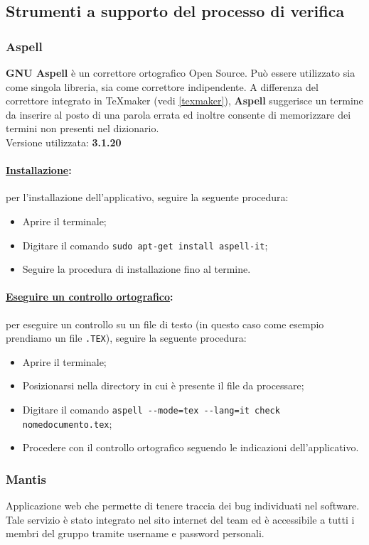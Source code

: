 \subsection{Strumenti a supporto del processo di verifica}

\subsubsection{Aspell}
\label{aspell}
\textbf{GNU Aspell} è un correttore ortografico Open Source. Può essere utilizzato sia come singola libreria, sia come correttore indipendente. A differenza del correttore integrato in \TeX{}maker (vedi \ref{texmaker}), \textbf{Aspell} suggerisce un termine da inserire al posto di una parola errata ed inoltre consente di memorizzare dei termini non presenti nel dizionario.\\
Versione utilizzata: \textbf{3.1.20}

\paragraph{\underline{Installazione}:} per l'installazione dell'applicativo, seguire la seguente procedura:
\begin{itemize}
\item Aprire il terminale;
\item Digitare il comando \verb!sudo apt-get install aspell-it!;
\item Seguire la procedura di installazione fino al termine.
\end{itemize}

\paragraph{\underline{Eseguire un controllo ortografico}:} per eseguire un controllo su un file di testo (in questo caso come esempio prendiamo un file \verb!.TEX!), seguire la seguente procedura:
\begin{itemize}
\item Aprire il terminale;
\item Posizionarsi nella directory in cui è presente il file da processare;
\item Digitare il comando \verb!aspell --mode=tex --lang=it check nomedocumento.tex!;
\item Procedere con il controllo ortografico seguendo le indicazioni dell'applicativo.
\end{itemize}

\subsubsection{Mantis}
\label{mantis}
Applicazione web che permette di tenere traccia dei bug individuati nel software. Tale servizio è stato integrato nel sito internet del team ed è accessibile a tutti i membri del gruppo tramite username e password personali.


